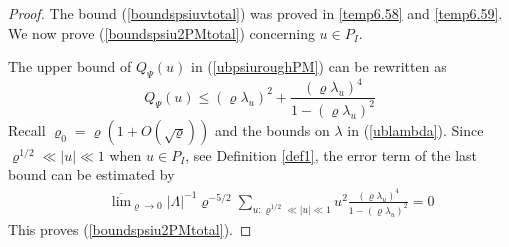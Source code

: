 \documentclass[11pt]{article}
\numberwithin{equation}{section}
\newcommand{\beq}{\begin{equation}}
\newcommand{\eeq}{\end{equation}}
\newcommand{\beqa}{\begin{eqnarray}}
\newcommand{\eeqa}{\end{eqnarray}}
\newcommand\const{{\rm const.\, }}
\renewcommand\rho\varrho
\theoremstyle{definition}
\begin{document}
\begin{proof} The bound  (\ref{boundspsiuvtotal}) was proved in \eqref{temp6.58} and \eqref{temp6.59}. 
We now prove  (\ref{boundspsiu2PMtotal}) concerning $ u\in P_I$.

The upper bound of $ Q_\Psi(u)$   in (\ref{ubpsiuroughPM}) can be rewritten as  
\beq
 Q_\Psi(u) \leq (\rho\lambda_u)^2+\frac{(\rho\lambda_u)^4}{1-(\rho\lambda_u)^2}
\eeq
Recall $\rho_{0} = \rho(1 + O(\sqrt \rho))$  and 
the bounds on $\lambda$ in (\ref{ublambda}).  
Since $\rho^{1/2}\ll|u|\ll 1$ when $u\in P_I$, see Definition \ref{def1}, the error term of the last bound can be estimated by 
\beqa
&&\overline\lim_{\rho\to0} |\Lambda|^{-1} \rho^{-5/2} \sum_{u: \rho^{1/2}\ll|u|\ll 1}u^2\frac{(\rho\lambda_u)^4}{1-(\rho\lambda_u)^2}=0
\eeqa
This proves  (\ref{boundspsiu2PMtotal}).



\end{proof}
\end{document}
